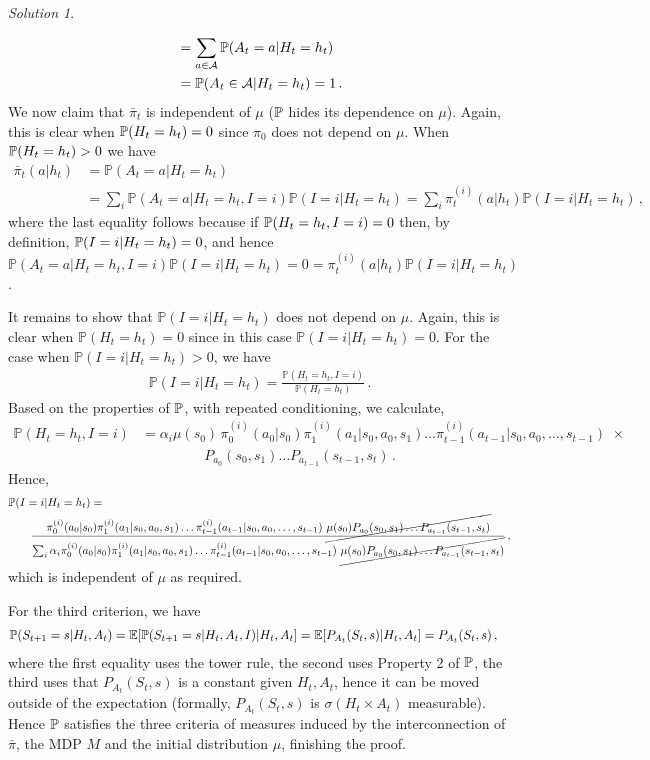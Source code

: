 \documentclass{article}
\DeclareMathOperator*{\1}{\mathbbm{1}}
\newcommand{\E}{\mathbb E}
\newcommand{\Prob}[1]{\mathbb{P}( #1 )}
\newcommand{\EE}[1]{\E[#1]}
\newcommand{\0}{\mathbf{0}}
\theoremstyle{definition}
\theoremstyle{remark}
\newtheorem*{solution*}{Solution}
\theoremstyle{theorem}
\newcommand{\cA}{\mathcal{A}}
\begin{document}
\begin{solution*}
\begin{enumerate}
\begin{align*}
&= \sum_{a\in \cA} \PP(A_t=a|H_t=h_t) \\
&=\PP(A_t\in \cA|H_t=h_t) =1\,.
\end{align*}
We now claim that $\bar \pi_t$ is independent of $\mu$ ($\mathbb{P}$ hides its dependence on $\mu$).
Again, this is clear when $\mathbb{P}(H_t = h_t)=0$ since $\pi_0$ does not depend on $\mu$.
When $\mathbb{P}(H_t=h_t)>0$ we have
\begin{align*}
\bar\pi_t(a|h_t)
&= \Prob{A_t=a|H_t=h_t}\\
&= \sum_i \Prob{A_t=a|H_t=h_t,I=i} \Prob{I=i|H_t=h_t}
=
\sum_i \pi^{(i)}_t(a|h_t) \Prob{I=i|H_t=h_t}\,,
\end{align*}
where the last equality follows because if $\mathbb{P}(H_t=h_t,I=i)=0$ then, by definition,
$\mathbb{P}(I=i|H_t=h_t)=0$, and hence
$\Prob{A_t=a|H_t=h_t,I=i} \Prob{I=i|H_t=h_t} = 0 = \pi^{(i)}_t(a|h_t) \Prob{I=i|H_t=h_t}$.

It remains to show that $ \Prob{I=i|H_t=h_t}$ does not depend on $\mu$.
Again, this is clear when $\Prob{H_t=h_t}=0$ since in this case $ \Prob{I=i|H_t=h_t}=0$.
For the case when $ \Prob{I=i|H_t=h_t}>0$, we have
\begin{align*}
\Prob{I=i|H_t=h_t} = \frac{\Prob{H_t=h_t,I=i}}{\Prob{H_t=h_t}}\,.
\end{align*}
Based on the properties of $\mathbb{P}$, with repeated conditioning, we calculate,
\begin{equation}
\begin{split}
\Prob{H_t=h_t,I=i}
&= \alpha_i\mu(s_0) \, \pi_0^{(i)}(a_0|s_0) \pi_1^{(i)}(a_1|s_0,a_0,s_1) \dots
\pi_{t-1}^{(i)}(a_{t-1}|s_0,a_0,\dots,s_{t-1}) \,\, \times \\
& \qquad  \qquad \,\,\, P_{a_0}(s_0,s_1) \dots P_{a_{t-1}}(s_{t-1},s_t)\,.
\end{split}
\label{eq:prodp}
\end{equation}
Hence,
\begin{align*}
\MoveEqLeft \Prob{I=i|H_t=h_t} =\\
& \frac{
\pi_0^{(i)}(a_0|s_0) \pi_1^{(i)}(a_1|s_0,a_0,s_1) \dots
\pi_{t-1}^{(i)}(a_{t-1}|s_0,a_0,\dots,s_{t-1}) \,\,
\cancel{\mu(s_0)P_{a_0}(s_0,s_1) \dots P_{a_{t-1}}(s_{t-1},s_t)}
}{
\sum_i \alpha_i\pi_0^{(i)}(a_0|s_0) \pi_1^{(i)}(a_1|s_0,a_0,s_1) \dots
\pi_{t-1}^{(i)}(a_{t-1}|s_0,a_0,\dots,s_{t-1}) \,\,
\cancel{\mu(s_0)P_{a_0}(s_0,s_1) \dots P_{a_{t-1}}(s_{t-1},s_t)}
}\,,
\end{align*}
which is independent of $\mu$ as required.

For the third criterion,
we have
\begin{align*}
\MoveEqLeft
\Prob{S_{t+1}=s|H_t, A_t}
 =
\EE{ \Prob{S_{t+1}=s|H_t, A_t, I} |H_t, A_t}
 =
\EE{ P_{A_t}(S_t,s)  |H_t, A_t}
 =
P_{A_t}(S_t,s)\,,
\end{align*}
where the first equality uses the tower rule, the second uses Property 2 of $\mathbb{P}$, the third uses that $P_{A_t}(S_t,s)$ is a constant given $H_t, A_t$, hence it can be moved outside of the expectation (formally, $P_{A_t}(S_t,s)$ is $\sigma(H_t \times A_t)$ measurable).
Hence $\mathbb{P}$ satisfies the three criteria of measures induced by the interconnection of $\bar \pi$, the MDP $M$ and the initial distribution $\mu$, finishing the proof.


\end{enumerate}
\end{solution*}
\end{document}

